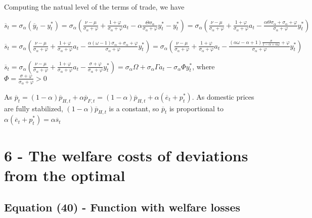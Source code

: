 \documentclass[
]{article}
\begin{document}
Computing the natual level of the terms of trade, we have

\(\displaystyle \overline{s}_t=\sigma_\alpha (\overline{y}_t-y_t^*)=\sigma_\alpha \left(\frac{\nu-\mu}{\sigma_\alpha+\varphi}+\frac{1+\varphi}{\sigma_\alpha+\varphi} a_t -\alpha \frac{\Theta \sigma_\alpha}{\sigma_\alpha+\varphi}y_t^* -y_t^* \right)=\sigma_\alpha \left(\frac{\nu-\mu}{\sigma_\alpha+\varphi}+\frac{1+\varphi}{\sigma_\alpha+\varphi} a_t - \frac{\alpha \Theta \sigma_\alpha+\sigma_\alpha+\varphi}{\sigma_\alpha+\varphi}y_t^* \right)\)

\(\displaystyle \overline{s}_t=\sigma_\alpha \left(\frac{\nu-\mu}{\sigma_\alpha+\varphi}+\frac{1+\varphi}{\sigma_\alpha+\varphi} a_t - \frac{\alpha (\omega-1) \sigma_\alpha+\sigma_\alpha+\varphi}{\sigma_\alpha+\varphi}y_t^* \right)=\sigma_\alpha \left(\frac{\nu-\mu}{\sigma_\alpha+\varphi}+\frac{1+\varphi}{\sigma_\alpha+\varphi} a_t - \frac{(\alpha \omega- \alpha+1)\displaystyle \frac{\sigma}{1-\alpha+\alpha \omega} +\varphi}{\sigma_\alpha+\varphi}y_t^* \right)\)

\(\displaystyle \overline{s}_t=\sigma_\alpha \left(\frac{\nu-\mu}{\sigma_\alpha+\varphi}+\frac{1+\varphi}{\sigma_\alpha+\varphi} a_t - \frac{\sigma +\varphi}{\sigma_\alpha+\varphi}y_t^* \right)=\sigma_\alpha \Omega+ \sigma_\alpha \Gamma a_t - \sigma_\alpha \Phi y_t^*\),
where
\(\displaystyle \Phi=\frac{\sigma+\varphi}{\sigma_\alpha+\varphi}>0\)

As
\(\overline{p}_t=(1-\alpha) \overline{p}_{H,t}+\alpha\overline{p}_{F,t} = (1-\alpha)\overline{p}_{H,t}+\alpha(\overline{e}_{t}+p_t^*)\).
As domestic prices are fully stabilized,
\((1-\alpha)\overline{p}_{H,t}\) is a constant, so \(\overline{p}_t\) is
proportional to
\(\alpha(\overline{e}_{t}+p_t^*) = \alpha \overline{s}_t\)

\vspace{12pt}

\hypertarget{the-welfare-costs-of-deviations-from-the-optimal}{%
\section{6 - The welfare costs of deviations from the
optimal}\label{the-welfare-costs-of-deviations-from-the-optimal}}

\vspace{12pt}

\hypertarget{equation-40---function-with-welfare-losses}{%
\subsection{Equation (40) - Function with welfare
losses}\label{equation-40---function-with-welfare-losses}}
\end{document}
